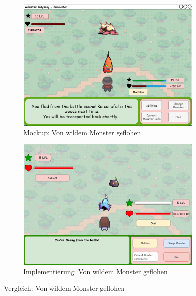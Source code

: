 \begin{figure}[H]
    \centering
    \begin{subfigure}[b]{0.4\textwidth}
        \includegraphics[width=\textwidth]{images/mockups/Encounter/EncounterWildFleed.png}
        \caption{Mockup: \phantom{desdes jetz}Von wildem Monster geflohen}
        \label{fig: Mockup: Von wildem Monster geflohen}
    \end{subfigure}
    \hfill
    \begin{subfigure}[b]{0.4\textwidth}
        \includegraphics[width=\textwidth]{images/implementation/Encounter/vomkampfgeflohen.PNG}
        \caption{Implementierung: Von wildem Monster geflohen}
        \label{fig: Implementierung: Von wildem Monster geflohen}
    \end{subfigure}
    \caption{Vergleich: Von wildem Monster geflohen}
    \label{fig: Vergleich: Von wildem Monster geflohen}
\end{figure}